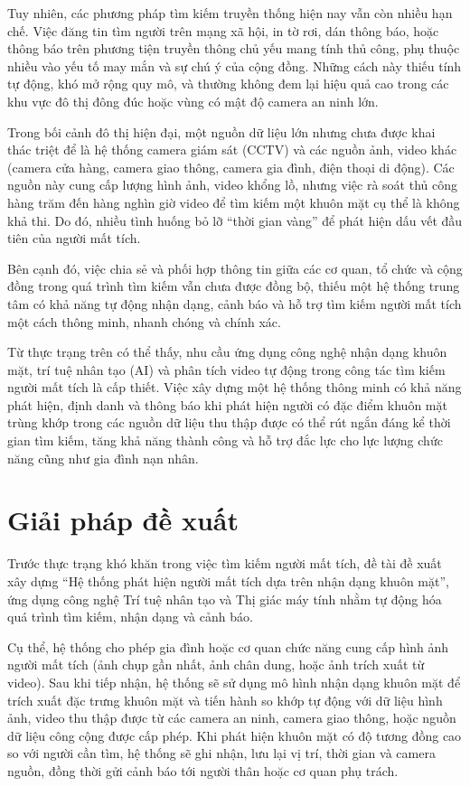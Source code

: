 \documentclass[../DoAn.tex]{subfiles}
\begin{document}
Tuy nhiên, các phương pháp tìm kiếm truyền thống hiện nay vẫn còn nhiều hạn chế. Việc đăng tin tìm người trên mạng xã hội, in tờ rơi, dán thông báo, hoặc thông báo trên phương tiện truyền thông chủ yếu mang tính thủ công, phụ thuộc nhiều vào yếu tố may mắn và sự chú ý của cộng đồng. Những cách này thiếu tính tự động, khó mở rộng quy mô, và thường không đem lại hiệu quả cao trong các khu vực đô thị đông đúc hoặc vùng có mật độ camera an ninh lớn.

Trong bối cảnh đô thị hiện đại, một nguồn dữ liệu lớn nhưng chưa được khai thác triệt để là hệ thống camera giám sát (CCTV) và các nguồn ảnh, video khác (camera cửa hàng, camera giao thông, camera gia đình, điện thoại di động). Các nguồn này cung cấp lượng hình ảnh, video khổng lồ, nhưng việc rà soát thủ công hàng trăm đến hàng nghìn giờ video để tìm kiếm một khuôn mặt cụ thể là không khả thi. Do đó, nhiều tình huống bỏ lỡ “thời gian vàng” để phát hiện dấu vết đầu tiên của người mất tích.

Bên cạnh đó, việc chia sẻ và phối hợp thông tin giữa các cơ quan, tổ chức và cộng đồng trong quá trình tìm kiếm vẫn chưa được đồng bộ, thiếu một hệ thống trung tâm có khả năng tự động nhận dạng, cảnh báo và hỗ trợ tìm kiếm người mất tích một cách thông minh, nhanh chóng và chính xác.

Từ thực trạng trên có thể thấy, nhu cầu ứng dụng công nghệ nhận dạng khuôn mặt, trí tuệ nhân tạo (AI) và phân tích video tự động trong công tác tìm kiếm người mất tích là cấp thiết. Việc xây dựng một hệ thống thông minh có khả năng phát hiện, định danh và thông báo khi phát hiện người có đặc điểm khuôn mặt trùng khớp trong các nguồn dữ liệu thu thập được có thể rút ngắn đáng kể thời gian tìm kiếm, tăng khả năng thành công và hỗ trợ đắc lực cho lực lượng chức năng cũng như gia đình nạn nhân.

\section{Giải pháp đề xuất}
Trước thực trạng khó khăn trong việc tìm kiếm người mất tích, đề tài đề xuất xây dựng “Hệ thống phát hiện người mất tích dựa trên nhận dạng khuôn mặt”, ứng dụng công nghệ Trí tuệ nhân tạo và Thị giác máy tính nhằm tự động hóa quá trình tìm kiếm, nhận dạng và cảnh báo.

Cụ thể, hệ thống cho phép gia đình hoặc cơ quan chức năng cung cấp hình ảnh người mất tích (ảnh chụp gần nhất, ảnh chân dung, hoặc ảnh trích xuất từ video). Sau khi tiếp nhận, hệ thống sẽ sử dụng mô hình nhận dạng khuôn mặt để trích xuất đặc trưng khuôn mặt và tiến hành so khớp tự động với dữ liệu hình ảnh, video thu thập được từ các camera an ninh, camera giao thông, hoặc nguồn dữ liệu công cộng được cấp phép. Khi phát hiện khuôn mặt có độ tương đồng cao so với người cần tìm, hệ thống sẽ ghi nhận, lưu lại vị trí, thời gian và camera nguồn, đồng thời gửi cảnh báo tới người thân hoặc cơ quan phụ trách.
\end{document}
